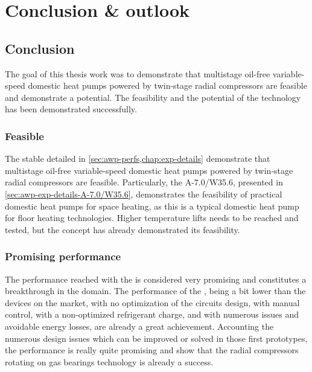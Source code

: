 \chapter{Conclusion \& outlook}
\label{chap:conclusion}
\resetallacronyms

\vspace{1em}

\section{Conclusion}
\label{sec:conclusion}

The goal of this thesis work was to demonstrate that multistage
oil-free variable-speed domestic heat pumps powered by twin-stage
radial compressors are feasible and demonstrate a potential. The
feasibility and the potential of the technology has been demonstrated
successfully.

\vspace{1em}

\subsection{Feasible}
\label{sec:concl-feasible}

The stable \OP{} detailed in \cref{sec:awp-perfs,chap:exp-details}
demonstrate that multistage oil-free variable-speed domestic heat
pumps powered by twin-stage radial compressors are
feasible. Particularly, the \OP{} A-7.0/W35.6, presented in
\cref{sec:awp-exp-details-A-7.0/W35.6}, demonstrates the feasibility
of practical domestic heat pumps for space heating, as this \OP{} is a
typical domestic heat pump \OP{} for floor heating
technologies. Higher temperature lifts needs to be reached and tested,
but the concept has already demonstrated its feasibility.

\vspace{1em}

\subsection{Promising performance}
\label{sec:concl-potential}

The performance reached with the \AWP{} is considered very promising
and constitutes a breakthrough in the domain. The performance of the
\AWP{}, being a bit lower than the devices on the market, with no
optimization of the circuits design, with manual control, with a
non-optimized refrigerant charge, and with numerous issues and
avoidable energy losses, are already a great achievement. Accounting
the numerous design issues which can be improved or solved in those
first prototypes, the performance is really quite promising and show
that the radial compressors rotating on gas bearings technology is
already a success.


